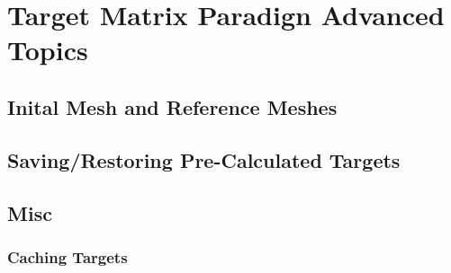 \chapter{Target Matrix Paradign Advanced Topics}

\section{Inital Mesh and Reference Meshes}

\section{Saving/Restoring Pre-Calculated Targets}

\section{Misc}

\subsection{Caching Targets}

